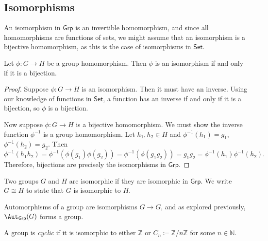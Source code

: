 \subsection{Isomorphisms}
An isomorphism in $\mathsf{Grp}$ is an invertible homomorphism, and since all homomorphisms are functions of sets, we might assume that an isomorphism is a bijective homomorphism, as this is the case of isomorphisms in $\mathsf{Set}$.
\begin{proposition}\label{prp:2.4.2}
	Let $\phi : G \to H$ be a group homomorphism. Then $\phi $ is an isomorphism if and only if it is a bijection.
\end{proposition}
\begin{proof}
	Suppose $\phi : G \to H$ is an isomorphism. Then it must have an inverse. Using our knowledge of functions in $\mathsf{Set}$, a function has an inverse if and only if it is a bijection, so $\phi $ is a bijection.

	Now suppose $\phi : G \to H$ is a bijective homomorphism. We must show the inverse function $\phi ^{-1}$ is a group homomorphism. Let $h_1,h_2\in H$ and $\phi ^{-1}(h_1)=g_1$, $\phi ^{-1}(h_2)=g_2$. Then
	\[
		\phi ^{-1}(h_1h_2)=\phi ^{-1}(\phi (g_1)\phi (g_2))=\phi ^{-1}(\phi (g_1g_2))=g_1g_2=\phi ^{-1}(h_1)\phi ^{-1}(h_2)
	.\]
	Therefore, bijections are precisely the isomorphisms in $\mathsf{Grp}$.
\end{proof}
\begin{definition}\label{dfn:2.4.1}
	Two groups $G$ and $H$ are isomorphic if they are isomorphic in $\mathsf{Grp}$. We write $G\cong H$ to state that $G$ is isomorphic to $H$.
\end{definition}
Automorphisms of a group are isomorphisms $G\to G$, and as explored previously, $\Aut_{\mathsf{Grp}}( G ) $ forms a group.
\begin{definition}[Cyclic]\label{dfn:2.4.2}
	A group is \emph{cyclic} if it is isomorphic to either $\mathbb{Z}$ or $C_n\coloneqq \mathbb{Z}/n\mathbb{Z}$ for some $n\in\mathbb{N}$.
\end{definition}

